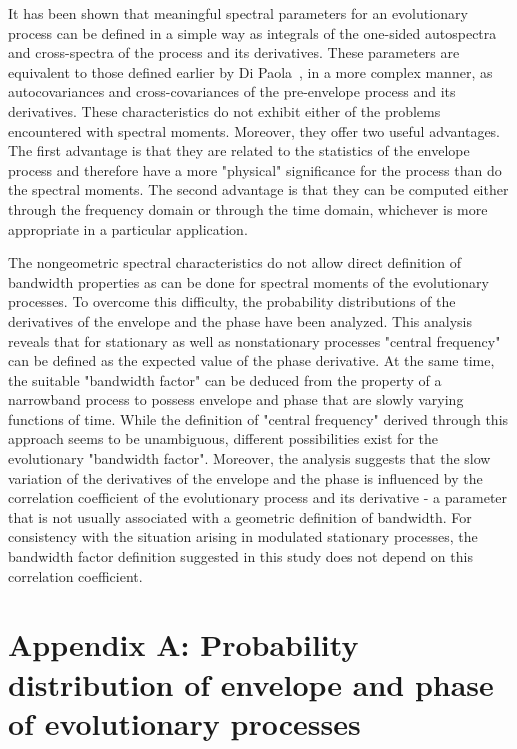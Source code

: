 \documentclass[12pt]{article}
\begin{document}
It has been shown that meaningful spectral parameters for an evolutionary process can be defined in a simple way as integrals of the one-sided autospectra and cross-spectra of the process and its derivatives. These parameters are equivalent to those defined earlier by Di Paola~\cite{DiPaola1985}, in a
more complex manner, as autocovariances and cross-covariances of the pre-envelope process and its derivatives. These characteristics do not exhibit either of the problems encountered with spectral moments. Moreover, they offer two useful advantages. The first advantage is that they are related to the statistics of the envelope process and therefore have a more "physical" significance for the process than do the spectral moments. The second advantage is that they can be computed either through the frequency domain or through the time domain, whichever is more appropriate in a particular application.

The nongeometric spectral characteristics do not allow direct definition of bandwidth properties as can be done for spectral moments of the evolutionary processes. To overcome this difficulty, the probability distributions of the derivatives of the envelope and the phase have been analyzed. This analysis reveals that for stationary as well as nonstationary processes "central frequency" can be defined as the expected value of the phase derivative. At the same time, the suitable "bandwidth factor" can be deduced from the property of a narrowband process to possess envelope and phase that are slowly varying functions of time. While the definition of "central frequency" derived through this approach seems to be unambiguous, different possibilities exist for the evolutionary "bandwidth factor". Moreover, the analysis suggests that the slow variation of the derivatives of the envelope and the phase is influenced by the correlation coefficient of the evolutionary process and its derivative - a parameter that is not usually associated with a geometric definition of bandwidth. For consistency with the situation arising in modulated stationary processes, the bandwidth factor definition suggested in this study does not depend on this correlation coefficient.

\section*{Appendix A: Probability distribution of envelope and phase of evolutionary processes}
\end{document}
